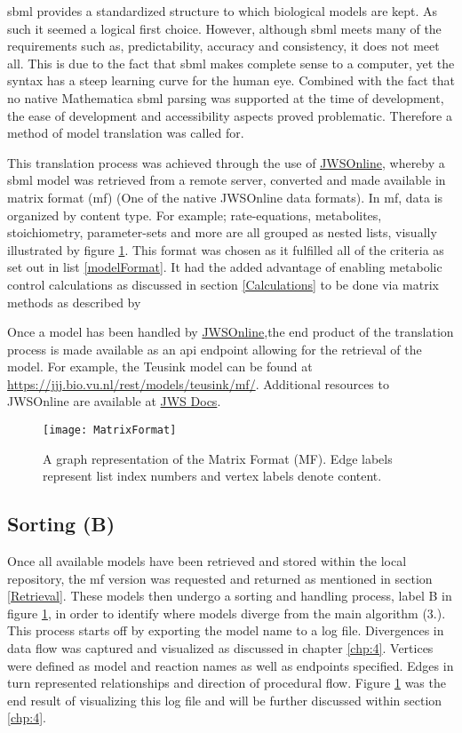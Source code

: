 \gls{sbml} provides a standardized structure to which biological models are kept. As such it seemed a logical first choice. However, although \gls{sbml} meets many of the requirements such as, predictability, accuracy and consistency, it does not meet all. This is due to the fact that \gls{sbml} makes complete sense to a computer, yet the syntax has a steep learning curve for the human eye. Combined with the fact that no native Mathematica \gls{sbml} parsing was supported at the time of development, the ease of development and accessibility aspects proved problematic. Therefore a method of model translation was called for. 

This translation process was achieved through the use of \href{https://jjj.bio.vu.nl}{JWSOnline}, whereby a \gls{sbml} model was retrieved from a remote server, converted and made available in matrix format (\gls{mf}) (One of the native JWSOnline data formats). In \gls{mf}, data is organized by content type. For example; rate-equations, metabolites, stoichiometry, parameter-sets and more are all grouped as nested lists, visually illustrated by figure \ref{fig:MatrixFormat}.  This format was chosen as it fulfilled all of the criteria as set out in list \ref{modelFormat}. It had the added advantage of enabling metabolic control calculations as discussed in section \ref{Calculations} to be done via matrix methods as described by \citeauthor{Hofmeyr2001}

Once a model has been handled by \href{https://jjj.bio.vu.nl}{JWSOnline},the end product of the translation process is made available as an \gls{api} endpoint allowing for the retrieval of the model. For example, the Teusink model can be found at \href{https://jjj.bio.vu.nl/rest/models/teusink/mf/}{https://jjj.bio.vu.nl/rest/models/teusink/mf/}. Additional resources to JWSOnline are available at \href{http://jws-docs.readthedocs.io/8_rest.html}{JWS Docs}. 

\begin{figure}[p]
\texttt{[image: MatrixFormat]}
\centering
\caption{A graph representation of the Matrix Format (MF). Edge labels represent list index numbers and vertex labels denote content.}
\label{fig:MatrixFormat}
\end{figure}

\subsection{Sorting (B)}\label{Sorting}
Once all available models have been retrieved and stored within the local repository, the mf version was requested and returned as mentioned in section \ref{Retrieval}. These models then undergo a sorting and handling process, label B in figure \ref{fig:MatrixFormat}, in order to identify where models diverge from the main algorithm (3.). This process starts off by exporting the model name to a log file. Divergences in data flow was captured and visualized as discussed in chapter \ref{chp:4}. Vertices were defined as model and reaction names as well as endpoints specified. Edges in turn represented relationships and direction of procedural flow. Figure \ref{fig:MatrixFormat} was the end result of visualizing this log file and will be further discussed within section \ref{chp:4}. 

